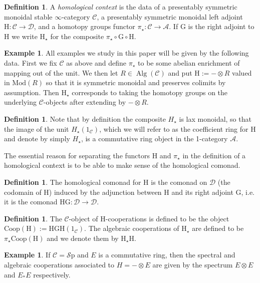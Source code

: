 \documentclass[10pt]{amsart}
\theoremstyle{definition}
\numberwithin{figure}{section}
\numberwithin{equation}{section}
\newtheorem{definition}[figure]{Definition}
\newtheorem{example}[figure]{Example}
\newcommand{\cA}{\mathcal{A}}
\newcommand{\cC}{\mathcal{C}}
\newcommand{\cD}{\mathcal{D}}
\newcommand{\one}{\mathrm{1}}
\theoremstyle{cited}
\newcommand{\Alg}{\operatorname{Alg}}
\newcommand{\Sp}{{\mathcal{S}\mathrm{p}}}
\newcommand{\Mod}{\mathrm{Mod}}
\renewcommand{\H}{\mathrm{H}}
\newcommand{\G}{\mathrm{G}}
\newcommand{\Coop}{\mathrm{Coop}}
\begin{document}
\begin{definition}
  \label{def:homcontext}
  A \textit{homological context} is the data of a presentably symmetric monoidal  stable $\infty$-category $\cC$, a presentably symmetric monoidal left adjoint $\H:\cC\to \cD$, and a homotopy groups functor $\pi_\star:\cC\to \cA$. If $\G$ is the right adjoint to $\H$ we write $\H_\star$ for the composite $\pi_\star\circ \G\circ \H$.
\end{definition}

\begin{example}
  All examples we study in this paper will be given by the following data. First we fix $\cC$ as above and define $\pi_\star$ to be some abelian enrichment of mapping out of the unit. We then let $R\in \Alg(\cC)$ and put $\H:=-\otimes R$ valued in $\Mod(R)$ so that it is symmetric monoidal and preserves colimits by assumption. Then $\H_\star$ corresponds to taking the homotopy groups on the underlying $\cC$-objects after extending by $-\otimes R$.
\end{example}

\begin{definition}
  Note that by definition the composite $H_\star$ is lax monoidal, so that the image of the unit $H_\star(\one_{\cC})$, which we will refer to as the coefficient ring for $\H$ and denote by simply $H_\star$, is a commutative ring object in the 1-category $\cA$.
\end{definition}

The essential reason for separating the functors $\H$ and $\pi_\star$ in the definition of a homological context is to be able to make sense of the homological comonad.

\begin{definition}
  The homological comonad for $\H$ is the comonad on $\cD$ (the codomain of $\H$) induced by the adjunction between $\H$ and its right adjoint $\G$, i.e. it is the comonad $\H\G: \cD\to \cD$. 
\end{definition}

\begin{definition}
  The $\cC$-object of $\H$-cooperations is defined to be the object $\Coop(\H):=\H\G\H(\one_{\cC})$. The algebraic cooperations of $\H_\star$ are defined to be $\pi_\star\Coop(\H)$ and we denote them by $\H_\star \H$.
\end{definition}

\begin{example}
  If $\cC=\Sp$ and $E$ is a commutative ring, then the spectral and algebraic cooperations associated to $H=-\otimes E$ are given by the spectrum $E\otimes E$ and $E_*E$ respectively.
\end{example}
\end{document}
